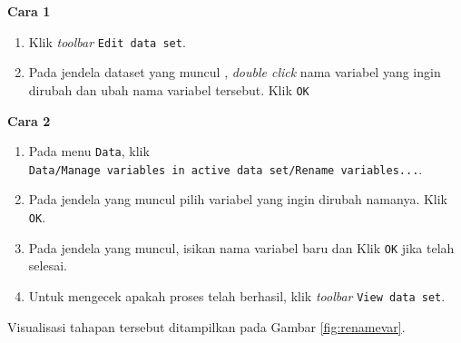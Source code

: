 \documentclass[12pt,]{krantz}
\providecommand{\tightlist}{%
  \setlength{\itemsep}{0pt}\setlength{\parskip}{0pt}}
\begin{document}
\textbf{Cara 1}

\begin{enumerate}
\def\labelenumi{\arabic{enumi}.}
\tightlist
\item
  Klik \emph{toolbar} \texttt{Edit\ data\ set}.
\item
  Pada jendela dataset yang muncul , \emph{double click} nama variabel yang ingin dirubah dan ubah nama variabel tersebut. Klik \texttt{OK}
\end{enumerate}

\textbf{Cara 2}

\begin{enumerate}
\def\labelenumi{\arabic{enumi}.}
\tightlist
\item
  Pada menu \texttt{Data}, klik \texttt{Data/Manage\ variables\ in\ active\ data\ set/Rename\ variables...}.
\item
  Pada jendela yang muncul pilih variabel yang ingin dirubah namanya. Klik \texttt{OK}.
\item
  Pada jendela yang muncul, isikan nama variabel baru dan Klik \texttt{OK} jika telah selesai.
\item
  Untuk mengecek apakah proses telah berhasil, klik \emph{toolbar} \texttt{View\ data\ set}.
\end{enumerate}

Visualisasi tahapan tersebut ditampilkan pada Gambar \ref{fig:renamevar}.
\end{document}
